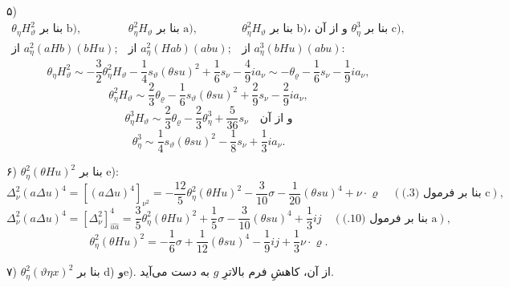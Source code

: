 \documentclass[11pt]{article}
\providecommand{\A}{\Delta}
\begin{document}
\noindent ۵)
\[
\begin{array}{ccc}
\theta_\eta H_\vartheta^2\text{ بنا بر b)},&
\theta_\eta^2H_\vartheta\text{ بنا بر a)},&
\theta_\eta^2H_\vartheta\text{ بنا بر b)، و از آن }\theta_\eta^3\text{ بنا بر c)},\\
\text{از }a_\eta^2(aHb)(bHu);&
\text{از }a_\eta^2(Hab)(abu);&
\text{از }a_\eta^3(bHu)(abu):
\end{array}
\]
\[
\theta_\eta H_\vartheta^2\sim-\frac32\theta_\eta^2H_\vartheta-\frac14s_\vartheta(\theta su)^2+\frac16s_\nu-\frac49ia_\nu
\sim-\theta_\varrho-\frac16s_\nu-\frac19ia_\nu,
\]
\[
\theta_\eta^2H_\vartheta\sim\frac23\theta_\varrho-\frac16s_\vartheta(\theta su)^2+\frac29s_\nu-\frac29ia_\nu,
\]
\[
\theta_\eta^3H_\vartheta\sim\frac23\theta_\varrho-\frac23\theta_\eta^3+\frac5{36}s_\nu\quad\text{و از آن}
\]
\[
\theta_\eta^3\sim\frac14s_\vartheta(\theta su)^2-\frac18s_\nu+\frac13ia_\nu.
\]

\noindent ۶) $\theta_\eta^2(\theta Hu)^2$ بنا بر e):
\[
\A_\nu^2(a\A u)^4=[(a\A u)^4]_{\nu^2}=-\frac{12}{5}\theta_\eta^2(\theta Hu)^2-\frac3{10}\sigma-\frac1{20}(\theta su)^4+\nu\cdot\varrho
\quad(\text{بنا بر فرمول (3.) c}),
\]
\[
\A_\nu^2(a\A u)^4=[\A_\nu^2]^4_{\widehat{u a}}=\frac35\theta_\eta^2(\theta Hu)^2+\frac15\sigma-\frac3{10}(\theta su)^4+\frac13ij
\quad(\text{بنا بر فرمول (10.) a}),
\]
\[
\theta_\eta^2(\theta Hu)^2=-\frac16\sigma+\frac1{12}(\theta su)^4-\frac19ij+\frac13\nu\cdot\varrho.
\]

\noindent ۷) $\theta_\eta^2(\vartheta\eta x)^2$ بنا بر d) وe). از آن، کاهشِ فرم بالاترِ $g$ به دست می‌آید.
\end{document}
